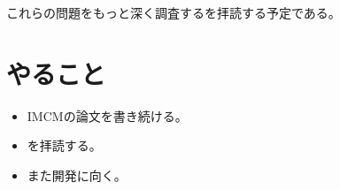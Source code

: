 \documentclass[a4paper, 11pt]{article}
\begin{document}
これらの問題をもっと深く調査する\cite{EstimationOfGuitarString}を拝読する予定である。

\section*{やること}
\begin{itemize}
    \item IMCMの論文を書き続ける。
    \item \cite{EstimationOfGuitarString}を拝読する。
    \item また開発に向く。
\end{itemize}


\printbibliography
\end{document}

